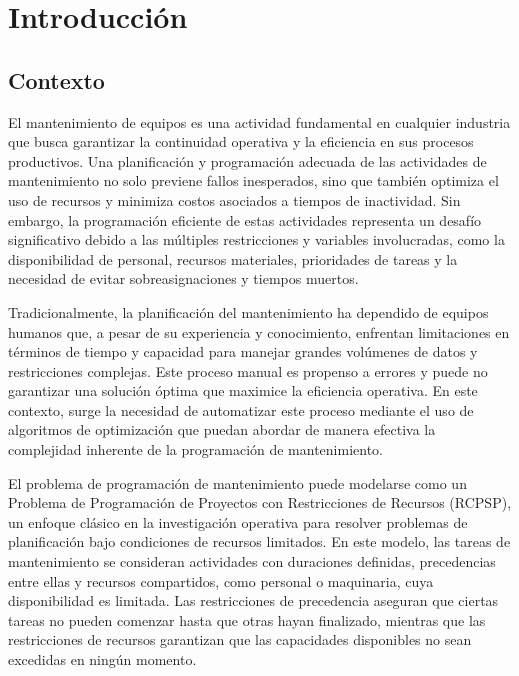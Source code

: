 \documentclass{article}
\begin{document}
\newpage

\tableofcontents
\newpage

\section{Introducción}
\subsection{Contexto}
El mantenimiento de equipos es una actividad fundamental en cualquier industria que busca garantizar la continuidad operativa y la eficiencia en sus procesos productivos. Una planificación y programación adecuada de las actividades de mantenimiento no solo previene fallos inesperados, sino que también optimiza el uso de recursos y minimiza costos asociados a tiempos de inactividad. Sin embargo, la programación eficiente de estas actividades representa un desafío significativo debido a las múltiples restricciones y variables involucradas, como la disponibilidad de personal, recursos materiales, prioridades de tareas y la necesidad de evitar sobreasignaciones y tiempos muertos.

Tradicionalmente, la planificación del mantenimiento ha dependido de equipos humanos que, a pesar de su experiencia y conocimiento, enfrentan limitaciones en términos de tiempo y capacidad para manejar grandes volúmenes de datos y restricciones complejas. Este proceso manual es propenso a errores y puede no garantizar una solución óptima que maximice la eficiencia operativa. En este contexto, surge la necesidad de automatizar este proceso mediante el uso de algoritmos de optimización que puedan abordar de manera efectiva la complejidad inherente de la programación de mantenimiento.

El problema de programación de mantenimiento puede modelarse como un Problema de Programación de Proyectos con Restricciones de Recursos (RCPSP), un enfoque clásico en la investigación operativa para resolver problemas de planificación bajo condiciones de recursos limitados. En este modelo, las tareas de mantenimiento se consideran actividades con duraciones definidas, precedencias entre ellas y recursos compartidos, como personal o maquinaria, cuya disponibilidad es limitada. Las restricciones de precedencia aseguran que ciertas tareas no pueden comenzar hasta que otras hayan finalizado, mientras que las restricciones de recursos garantizan que las capacidades disponibles no sean excedidas en ningún momento. 
\end{document}
